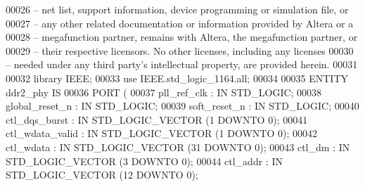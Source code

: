 \begin{DoxyCode}
{00026 \textcolor{keyword}{-- net list, support information, device programming or simulation file, or}
00027 \textcolor{keyword}{-- any other related documentation or information provided by Altera or a}
00028 \textcolor{keyword}{-- megafunction partner, remains with Altera, the megafunction partner, or}
00029 \textcolor{keyword}{-- their respective licensors.  No other licenses, including any licenses}
00030 \textcolor{keyword}{-- needed under any third party's intellectual property, are provided herein.}
00031 
00032 \textcolor{vhdlkeyword}{library }\textcolor{keywordflow}{IEEE};
00033 \textcolor{vhdlkeyword}{use }IEEE.std\_logic\_1164.\textcolor{keywordflow}{all};
00034 
00035 \textcolor{keywordflow}{ENTITY }ddr2_phy \textcolor{keywordflow}{IS}
00036     \textcolor{keywordflow}{PORT} \textcolor{vhdlchar}{(}
00037         \textcolor{vhdlchar}{pll_ref_clk} \textcolor{vhdlchar}{:} \textcolor{keywordflow}{IN} \textcolor{comment}{STD\_LOGIC};
00038         \textcolor{vhdlchar}{global_reset_n}  \textcolor{vhdlchar}{:} \textcolor{keywordflow}{IN} \textcolor{comment}{STD\_LOGIC};
00039         \textcolor{vhdlchar}{soft_reset_n}    \textcolor{vhdlchar}{:} \textcolor{keywordflow}{IN} \textcolor{comment}{STD\_LOGIC};
00040         \textcolor{vhdlchar}{ctl_dqs_burst}   \textcolor{vhdlchar}{:} \textcolor{keywordflow}{IN} \textcolor{comment}{STD\_LOGIC\_VECTOR} \textcolor{vhdlchar}{(}\textcolor{vhdllogic}{}\textcolor{vhdllogic}{1} \textcolor{keywordflow}{DOWNTO} \textcolor{vhdllogic}{}\textcolor{vhdllogic}{0}\textcolor{vhdlchar}{)};
00041         \textcolor{vhdlchar}{ctl_wdata_valid} \textcolor{vhdlchar}{:} \textcolor{keywordflow}{IN} \textcolor{comment}{STD\_LOGIC\_VECTOR} \textcolor{vhdlchar}{(}\textcolor{vhdllogic}{}\textcolor{vhdllogic}{1} \textcolor{keywordflow}{DOWNTO} \textcolor{vhdllogic}{}\textcolor{vhdllogic}{0}\textcolor{vhdlchar}{)};
00042         \textcolor{vhdlchar}{ctl_wdata}   \textcolor{vhdlchar}{:} \textcolor{keywordflow}{IN} \textcolor{comment}{STD\_LOGIC\_VECTOR} \textcolor{vhdlchar}{(}\textcolor{vhdllogic}{}\textcolor{vhdllogic}{31} \textcolor{keywordflow}{DOWNTO} \textcolor{vhdllogic}{}\textcolor{vhdllogic}{0}\textcolor{vhdlchar}{)};
00043         \textcolor{vhdlchar}{ctl_dm}  \textcolor{vhdlchar}{:} \textcolor{keywordflow}{IN} \textcolor{comment}{STD\_LOGIC\_VECTOR} \textcolor{vhdlchar}{(}\textcolor{vhdllogic}{}\textcolor{vhdllogic}{3} \textcolor{keywordflow}{DOWNTO} \textcolor{vhdllogic}{}\textcolor{vhdllogic}{0}\textcolor{vhdlchar}{)};
00044         \textcolor{vhdlchar}{ctl_addr}    \textcolor{vhdlchar}{:} \textcolor{keywordflow}{IN} \textcolor{comment}{STD\_LOGIC\_VECTOR} \textcolor{vhdlchar}{(}\textcolor{vhdllogic}{}\textcolor{vhdllogic}{12} \textcolor{keywordflow}{DOWNTO} \textcolor{vhdllogic}{}\textcolor{vhdllogic}{0}\textcolor{vhdlchar}{)};
}
\end{DoxyCode}
